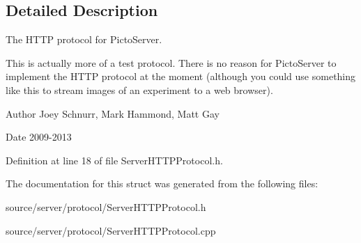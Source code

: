\subsection{Detailed Description}
The H\-T\-T\-P protocol for Picto\-Server. 

This is actually more of a test protocol. There is no reason for Picto\-Server to implement the H\-T\-T\-P protocol at the moment (although you could use something like this to stream images of an experiment to a web browser). \begin{DoxyAuthor}{Author}
Joey Schnurr, Mark Hammond, Matt Gay 
\end{DoxyAuthor}
\begin{DoxyDate}{Date}
2009-\/2013 
\end{DoxyDate}


Definition at line 18 of file Server\-H\-T\-T\-P\-Protocol.\-h.



The documentation for this struct was generated from the following files\-:\begin{DoxyCompactItemize}
\item 
source/server/protocol/Server\-H\-T\-T\-P\-Protocol.\-h\item 
source/server/protocol/Server\-H\-T\-T\-P\-Protocol.\-cpp\end{DoxyCompactItemize}
